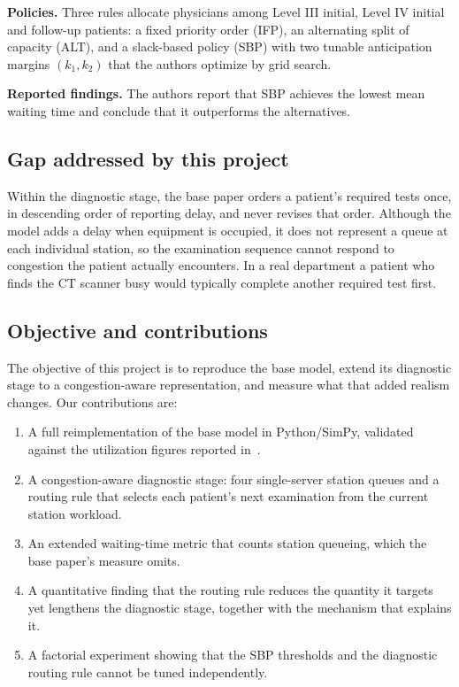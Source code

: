 \documentclass[sigconf]{acmart}
\begin{document}
\textbf{Policies.} Three rules allocate physicians among Level III initial,
Level IV initial and follow-up patients: a fixed priority order (IFP), an
alternating split of capacity (ALT), and a slack-based policy (SBP) with two
tunable anticipation margins $(k_1,k_2)$ that the authors optimize by grid
search.

\textbf{Reported findings.} The authors report that SBP achieves the lowest
mean waiting time and conclude that it outperforms the alternatives.

\subsection{Gap addressed by this project}

Within the diagnostic stage, the base paper orders a patient's required tests
once, in descending order of reporting delay, and never revises that order.
Although the model adds a delay when equipment is occupied, it does not
represent a queue at each individual station, so the examination sequence
cannot respond to congestion the patient actually encounters. In a real
department a patient who finds the CT scanner busy would typically complete
another required test first.

\subsection{Objective and contributions}

The objective of this project is to reproduce the base model, extend its
diagnostic stage to a congestion-aware representation, and measure what that
added realism changes. Our contributions are:

\begin{enumerate}
\item A full reimplementation of the base model in Python/SimPy, validated
against the utilization figures reported in~\cite{lv2026des}.
\item A congestion-aware diagnostic stage: four single-server station queues
and a routing rule that selects each patient's next examination from the
current station workload.
\item An extended waiting-time metric that counts station queueing, which the
base paper's measure omits.
\item A quantitative finding that the routing rule reduces the quantity it
targets yet lengthens the diagnostic stage, together with the mechanism that
explains it.
\item A factorial experiment showing that the SBP thresholds and the diagnostic
routing rule cannot be tuned independently.
\end{enumerate}
\end{document}
